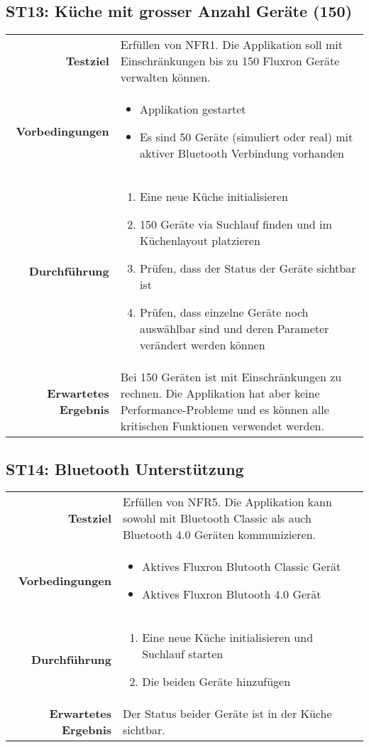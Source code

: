 \subsection{ST13: Küche mit grosser Anzahl Geräte (150)}
\begin{table}[H]
\begin{tabularx}{\textwidth}{r X }
\textbf{Testziel} & Erfüllen von \ac{NFR}1. Die Applikation soll mit Einschränkungen bis zu 150 Fluxron Geräte verwalten können.\\
\textbf{Vorbedingungen} & \begin{itemize}
\item Applikation gestartet
\item Es sind 50 Geräte (simuliert oder real) mit aktiver Bluetooth Verbindung vorhanden
\end{itemize} \\
\textbf{Durchführung} & \begin{enumerate}
\item Eine neue Küche initialisieren
\item 150 Geräte via Suchlauf finden und im Küchenlayout platzieren
\item Prüfen, dass der Status der Geräte sichtbar ist
\item Prüfen, dass einzelne Geräte noch auswählbar sind und deren Parameter verändert werden können
\end{enumerate} \\
\textbf{Erwartetes Ergebnis} & Bei 150 Geräten ist mit Einschränkungen zu rechnen. Die Applikation hat aber keine Performance-Probleme und es können alle kritischen Funktionen verwendet werden.\\
\end{tabularx}
\end{table}

\subsection{ST14: Bluetooth Unterstützung}
\begin{table}[H]
\begin{tabularx}{\textwidth}{r X }
\textbf{Testziel} & Erfüllen von \ac{NFR}5. Die Applikation kann sowohl mit Bluetooth Classic als auch Bluetooth 4.0 Geräten kommunizieren. \\
\textbf{Vorbedingungen} & \begin{itemize}
\item Aktives Fluxron Blutooth Classic Gerät
\item Aktives Fluxron Blutooth 4.0 Gerät
\end{itemize}\\
\textbf{Durchführung} & \begin{enumerate}
\item Eine neue Küche initialisieren und Suchlauf starten
\item Die beiden Geräte hinzufügen
\end{enumerate} \\
\textbf{Erwartetes Ergebnis} & Der Status beider Geräte ist in der Küche sichtbar.\\
\end{tabularx}
\end{table}


